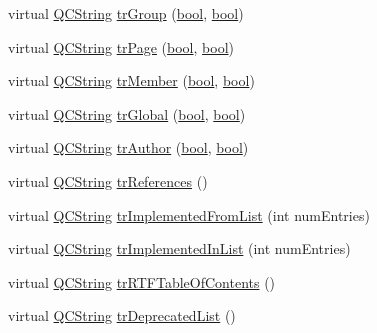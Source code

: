 \begin{DoxyCompactItemize}
\item 
virtual \hyperlink{class_q_c_string}{Q\+C\+String} \hyperlink{class_translator_chinese_a245f51a8f8ea56eb5a8802e5ce25760e}{tr\+Group} (\hyperlink{qglobal_8h_a1062901a7428fdd9c7f180f5e01ea056}{bool}, \hyperlink{qglobal_8h_a1062901a7428fdd9c7f180f5e01ea056}{bool})
\item 
virtual \hyperlink{class_q_c_string}{Q\+C\+String} \hyperlink{class_translator_chinese_a9ee1adcfb54d28ad2ded307ec2c2d577}{tr\+Page} (\hyperlink{qglobal_8h_a1062901a7428fdd9c7f180f5e01ea056}{bool}, \hyperlink{qglobal_8h_a1062901a7428fdd9c7f180f5e01ea056}{bool})
\item 
virtual \hyperlink{class_q_c_string}{Q\+C\+String} \hyperlink{class_translator_chinese_a4011f5d9da39a73cc371e00f0370abaa}{tr\+Member} (\hyperlink{qglobal_8h_a1062901a7428fdd9c7f180f5e01ea056}{bool}, \hyperlink{qglobal_8h_a1062901a7428fdd9c7f180f5e01ea056}{bool})
\item 
virtual \hyperlink{class_q_c_string}{Q\+C\+String} \hyperlink{class_translator_chinese_a2c90fe3ee18b178138d85e82085010d1}{tr\+Global} (\hyperlink{qglobal_8h_a1062901a7428fdd9c7f180f5e01ea056}{bool}, \hyperlink{qglobal_8h_a1062901a7428fdd9c7f180f5e01ea056}{bool})
\item 
virtual \hyperlink{class_q_c_string}{Q\+C\+String} \hyperlink{class_translator_chinese_a315ef35cadecda32032f4436150ff058}{tr\+Author} (\hyperlink{qglobal_8h_a1062901a7428fdd9c7f180f5e01ea056}{bool}, \hyperlink{qglobal_8h_a1062901a7428fdd9c7f180f5e01ea056}{bool})
\item 
virtual \hyperlink{class_q_c_string}{Q\+C\+String} \hyperlink{class_translator_chinese_a2ec6727ed78fb159ee6a95e8aa2132bf}{tr\+References} ()
\item 
virtual \hyperlink{class_q_c_string}{Q\+C\+String} \hyperlink{class_translator_chinese_a84df422ab63903672e55d008055bc7d0}{tr\+Implemented\+From\+List} (int num\+Entries)
\item 
virtual \hyperlink{class_q_c_string}{Q\+C\+String} \hyperlink{class_translator_chinese_a19566de80486f3f2cd62b33bd7f27d86}{tr\+Implemented\+In\+List} (int num\+Entries)
\item 
virtual \hyperlink{class_q_c_string}{Q\+C\+String} \hyperlink{class_translator_chinese_ac3028992d039e52e73e60bf63455dadb}{tr\+R\+T\+F\+Table\+Of\+Contents} ()
\item 
virtual \hyperlink{class_q_c_string}{Q\+C\+String} \hyperlink{class_translator_chinese_ad6459a83eadd7cbd8c41f9305f8983b3}{tr\+Deprecated\+List} ()
\item 

\end{DoxyCompactItemize}
